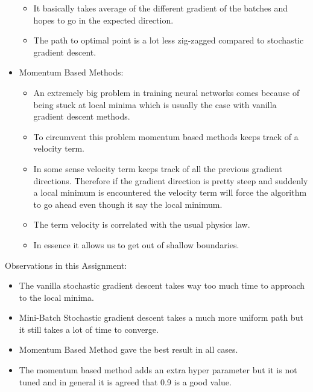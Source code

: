 \documentclass{article}
\begin{document}
\begin{itemize}
\begin{itemize}
  \item It basically takes average of the different gradient of the batches and hopes to go in the expected direction.
  \item The path to optimal point is a lot less zig-zagged compared to stochastic gradient descent.
  \end{itemize}
\item Momentum Based Methods:
  \begin{itemize}
  \item An extremely big problem in training neural networks comes because of being stuck at local minima which is usually the case with vanilla gradient descent methods.
  \item To circumvent this problem momentum based methods keeps track of a velocity term.
  \item In some sense velocity term keeps track of all the previous gradient directions. Therefore if the gradient direction is pretty steep and suddenly a local minimum is encountered the velocity term will force the algorithm to go ahead even though it say the local minimum.
  \item The term velocity is correlated with the usual physics law.
  \item In essence it allows us to get out of shallow boundaries.
  \end{itemize}
\end{itemize}

Observations in this Assignment:
\begin{itemize}
\item The vanilla stochastic gradient descent takes way too much time to approach to the local minima.
\item Mini-Batch Stochastic gradient descent takes a much more uniform path but it still takes a lot of time to converge.
\item Momentum Based Method gave the best result in all cases.
\item The momentum based method adds an extra hyper parameter but it is not tuned and in general it is agreed that 0.9 is a good value.
\end{itemize}
\end{document}
